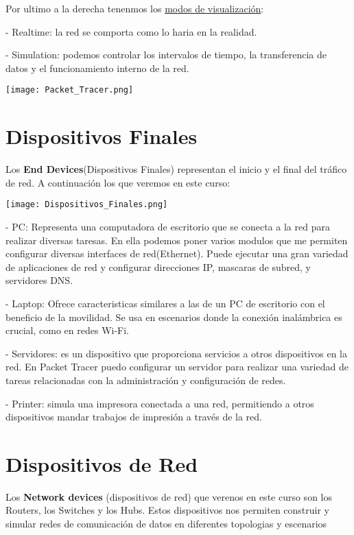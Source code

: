 \documentclass{article}
\begin{document}
Por ultimo a la derecha tenenmos los \underline{modos de visualización}:

- Realtime: la red se comporta como lo haria en la realidad.

- Simulation: podemos controlar los intervalos de tiempo, la transferencia de datos y el funcionamiento interno de la red.

\begin{center}
    \texttt{[image: Packet\_Tracer.png]}
\end{center}

\vspace{10pt}
\section{Dispositivos Finales}
Los \textbf{End Devices}(Dispositivos Finales) representan el inicio y el final del tráfico de red. A continuación los que veremos en este curso:

\begin{center}
    \texttt{[image: Dispositivos\_Finales.png]}
\end{center}

- PC: Representa una computadora de escritorio que se conecta a la red para realizar diversas taresas. En ella podemos poner varios modulos que me permiten configurar diversas interfaces de red(Ethernet). Puede ejecutar una gran variedad de aplicaciones de red y configurar direcciones IP, mascaras de subred, y servidores DNS.

- Laptop: Ofrece caracteristicas similares a las de un PC de escritorio con el beneficio de la movilidad. Se usa en escenarios donde la conexión inalámbrica es crucial, como en redes Wi-Fi.

- Servidores: es un dispositivo que proporciona servicios a otros dispositivos en la red. En Packet Tracer puedo configurar un servidor para realizar una variedad de tareas relacionadas con la administración y configuración de redes.

- Printer: simula una impresora conectada a una red, permitiendo a otros dispositivos mandar trabajos de impresión a través de la red.

\vspace{10pt}
\section{Dispositivos de Red}
Los \textbf{Network devices} (dispositivos de red) que verenos en este curso son los Routers, los Switches y los Hubs. Estos dispositivos nos permiten construir y simular redes de comunicación de datos en diferentes topologias y escenarios
\end{document}
